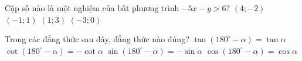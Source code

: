 \begin{ex}%
	Cặp số nào là một nghiệm của bất phương trình $-5x-y>6$?
	\choice
	{$(4;-2)$}
	{$(-1;1)$}
	{$(1;3)$}
	{\True $(-3;0)$}
\end{ex}		

\begin{ex}%
	Trong các đẳng thức sau đây, đẳng thức nào đúng?
	\choice
	{$\tan (180^\circ -\alpha)=\tan \alpha$}
	{\True $\cot (180^\circ -\alpha)=-\cot \alpha$}
	{$\sin (180^\circ -\alpha)=-\sin \alpha$}
	{$\cos (180^\circ -\alpha)=\cos \alpha$}
\end{ex}
